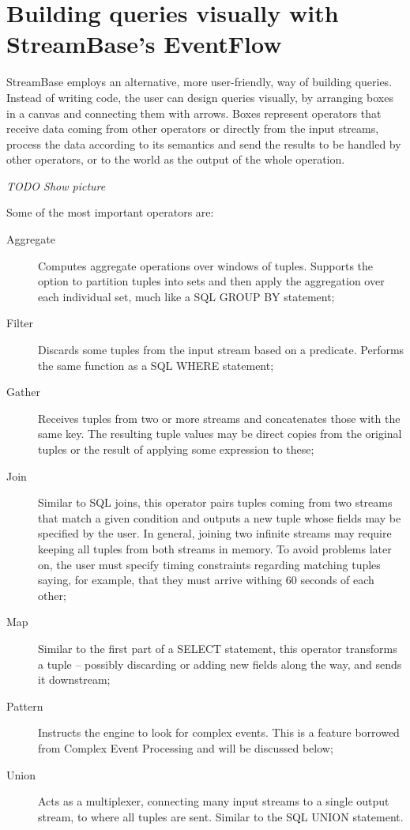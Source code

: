 \documentclass{report}
\begin{document}
\section{Building queries visually with StreamBase's EventFlow}

StreamBase employs an alternative, more user-friendly, way of building
queries. Instead of writing code, the user can design queries
visually, by arranging boxes in a canvas and connecting them with
arrows. Boxes represent operators that receive data coming from other
operators or directly from the input streams, process the data
according to its semantics and send the results to be handled by other
operators, or to the world as the output of the whole operation.

\emph{TODO Show picture}

Some of the most important operators are:

\begin{description}
\item [Aggregate] Computes aggregate operations over windows of
  tuples. Supports the option to partition tuples into sets and then
  apply the aggregation over each individual set, much like a SQL
  GROUP BY statement;
\item [Filter] Discards some tuples from the input stream based on a
  predicate. Performs the same function as a SQL WHERE statement;
\item [Gather] Receives tuples from two or more streams and
  concatenates those with the same key. The resulting tuple values may
  be direct copies from the original tuples or the result of applying
  some expression to these;
\item [Join] Similar to SQL joins, this operator pairs tuples coming
  from two streams that match a given condition and outputs a new
  tuple whose fields may be specified by the user. In general, joining
  two infinite streams may require keeping all tuples from both
  streams in memory. To avoid problems later on, the user must specify
  timing constraints regarding matching tuples saying, for example,
  that they must arrive withing 60 seconds of each other;
\item [Map] Similar to the first part of a SELECT statement, this
  operator transforms a tuple -- possibly discarding or adding new
  fields along the way, and sends it downstream;
\item [Pattern] Instructs the engine to look for complex events. This
  is a feature borrowed from Complex Event Processing and will be
  discussed below;
\item [Union] Acts as a multiplexer, connecting many input streams to
  a single output stream, to where all tuples are sent. Similar to the
  SQL UNION statement.
\end{description}
\end{document}
